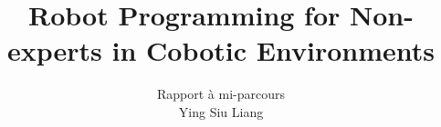 \title{Robot Programming for Non-experts in Cobotic Environments}
\author{Rapport \`{a} mi-parcours\\Ying Siu Liang}

%
